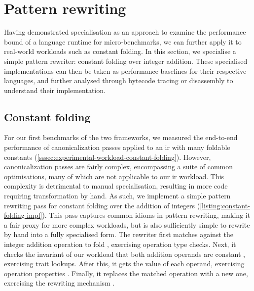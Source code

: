 \section{Pattern rewriting}
\label{sec:specialising-pattern-rewriting}

Having demonstrated specialisation as an approach to examine the performance bound of a language runtime for micro-benchmarks, we can further apply it to real-world workloads such as constant folding.
In this section, we specialise a simple pattern rewriter: constant folding over integer addition.
These specialised implementations can then be taken as performance baselines for their respective languages, and further analysed through bytecode tracing or disassembly to understand their implementation.


\subsection{Constant folding}
\label{sec:specialising-pattern-rewriting-workload}

For our first benchmarks of the two frameworks, we measured the end-to-end performance of canonicalization passes applied to an \ac{ir} with many foldable constants (\autoref{sssec:experimental-workload-constant-folding}).
However, canonicalization passes are fairly complex, encompassing a suite of common optimisations, many of which are not applicable to our \ac{ir} workload. This complexity is detrimental to manual specialisation, resulting in more code requiring transformation by hand.
As such, we implement a simple pattern rewriting pass for constant folding over the addition of integers (\autoref{listing:constant-folding-impl}). This pass captures common idioms in pattern rewriting, making it a fair proxy for more complex workloads, but is also sufficiently simple to rewrite by hand into a fully specialised form.
The rewriter first matches against the integer addition operation to fold , exercising operation type checks. Next, it checks the invariant of our workload that both addition operands are constant , exercising trait lookups. After this, it gets the value of each operand, exercising operation properties . Finally, it replaces the matched operation with a new one, exercising the rewriting mechanism .

